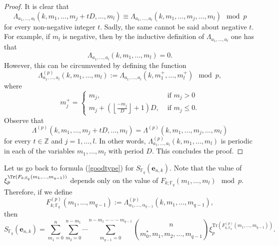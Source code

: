 \begin{proof}
It is clear that 
\begin{equation}
\Lambda_{a_1,\ldots, a_l}(k,m_1,\ldots,m_j+t D,\ldots,m_l)\equiv \Lambda_{a_1,\ldots, a_l}(k,m_1,\ldots,m_j,\ldots,m_l)\mod p
\end{equation}
for every non-negative integer $t$.  Sadly, the same cannot be said about negative $t$.  For example, if $m_l$ is negative, then by the inductive definition of $\Lambda_{a_1,\ldots, a_l}$ one has that $$\Lambda_{a_1,\ldots,a_l}(k,m_1,\ldots, m_l)=0.$$  However, this can be circumvented by defining the function 
$$\Lambda^{(p)}_{a_1,\ldots,a_l}(k,m_1,\ldots,m_l):= \Lambda_{a_1,\ldots,a_l}(k,m_1^{+},\ldots,m_l^{+})\mod p,$$
where 
\begin{equation}
m_j^{+} = \begin{cases}
 m_j, & \text{ if }m_j>0 \\
 m_j + \left(\left\lfloor\frac{-m_j}{D}\right\rfloor+1\right)D, & \text{ if }m_j\leq 0.
\end{cases}
\end{equation}
Observe that $$\Lambda^{(p)}(k,m_1,\ldots,m_j+t D,\ldots,m_l)=\Lambda^{(p)}(k,m_1,\ldots,m_j,\ldots,m_l)$$ for every $t\in \mathbb{Z}$ and $j=1,\ldots,l$.  In other words, $\Lambda^{(p)}_{a_1,\ldots,a_l}(k,m_1,\ldots,m_l)$ is periodic in each of the variables $m_1,\ldots,m_l$ with period $D$.  This concludes the proof.
\end{proof}

Let us go back to formula (\ref{goodtype}) for $S_{\mathbb{F}_q}(\boldsymbol{e}_{n,k})$.  Note that the value of $\xi_p^{\Tr(F_{k;\mathbb{F}_q}(m_1,\ldots,m_{q-1}))}$ depends only on the value of $F_{k;\mathbb{F}_q}(m_1,\ldots,m_l)\mod p$.  Therefore, if we define
\begin{equation}
F^{(p)}_{k;\mathbb{F}_q}(m_1,\ldots,m_{q-1}):= \Lambda^{(p)}_{\alpha_1,\ldots,\alpha_{q-1}}(k,m_1,\ldots,m_{q-1}),
\end{equation}
then
\begin{equation}
\label{goodtype2}
S_{\mathbb{F}_q}(\boldsymbol{e}_{n,k}) = \sum_{m_1=0}^n\sum_{m_2=0}^{n-m_1}\cdots\sum_{m_{q-1}=0}^{n-m_1-\cdots-m_{q-1}}{n\choose m_0^*,m_1,m_2,\ldots, m_{q-1}}\xi_p^{\text{Tr}
\left(F^{(p)}_{k,\mathbb{F}_q}\left(m_1,\ldots,m_{q-1}\right)\right)}.
\end{equation}

